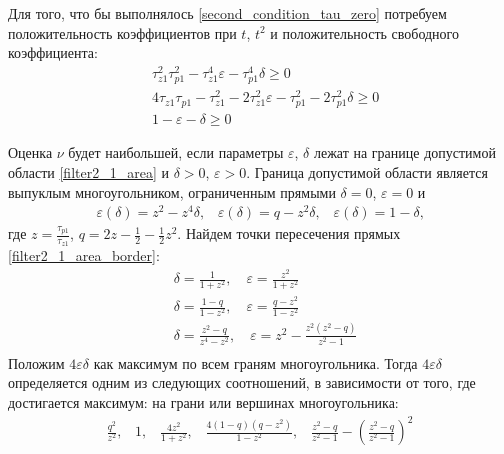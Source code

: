 \documentclass[a4paper,article,14pt]{extarticle}
\begin{document}
Для того, что бы выполнялось \eqref{second_condition_tau_zero} потребуем положительность коэффициентов при $t$, $t^2$ и положительность свободного коэффициента: 
 \begin{equation}\label{filter2_1_area}
 \begin{aligned}
&\tau_{z1}^2\tau_{p1}^2 - \tau_{z1}^4\varepsilon - \tau_{p1}^4\delta \geqslant 0\\
&4\tau_{z1}\tau_{p1} - \tau_{z1}^2 - 2\tau_{z1}^2\varepsilon - \tau_{p1}^2 - 2\tau_{p1}^2\delta \geqslant 0\\
&1-\varepsilon - \delta \geqslant 0
 \end{aligned}
\end{equation}

Оценка $\nu$ будет наибольшей, если параметры $\varepsilon$, $\delta$ лежат на границе допустимой области \eqref{filter2_1_area} и $\delta > 0$, $\varepsilon > 0$. Граница допустимой области является  выпуклым многоугольником, ограниченным прямыми $\delta = 0$, $\varepsilon = 0$ и
 \begin{equation}\label{filter2_1_area_border}
\begin{aligned}
\varepsilon(\delta)=z^2 - z^4\delta \text{,} \quad \varepsilon(\delta)=q - z^2\delta \text{,}
\quad \varepsilon(\delta)=1 - \delta \text{,}
\end{aligned}
\end{equation}
где $z = \frac{\tau_{p1}}{\tau_{z1}}$, $q = 2z - \frac{1}{2} - \frac{1}{2}z^2$. Найдем точки пересечения прямых \eqref{filter2_1_area_border}:
  \begin{equation}
 \begin{aligned}
&\delta = \frac{1}{1+z^2}, \quad \varepsilon = \frac{z^2}{1+z^2}\\
&\delta = \frac{1-q}{1-z^2}, \quad  \varepsilon = \frac{q-z^2}{1-z^2}\\
&\delta = \frac{z^2-q}{z^4-z^2}, \quad  \varepsilon = z^2 - \frac{z^2(z^2-q)}{z^2-1}\\
 \end{aligned}
\end{equation}
Положим $4\varepsilon\delta$ как максимум по всем граням многоугольника. Тогда $4\varepsilon\delta$ определяется одним из следующих соотношений, в зависимости от того, где достигается максимум: на грани или вершинах многоугольника:
 \begin{equation}\label{filter2_max}
\begin{aligned}
\frac{q^2}{z^2}\text{,} \quad 1 \text{,} \quad \frac{4z^2}{1+z^2} \text{,} \quad \frac{4(1-q)(q-z^2)}{1-z^2} \text{,} \quad \frac{z^2-q}{z^2-1} - \left(\frac{z^2-q}{z^2-1}\right)^2
\end{aligned}
\end{equation}
\end{document}
